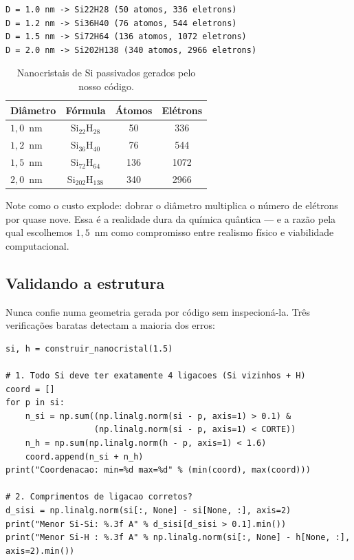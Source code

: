 \documentclass[11pt,a4paper,openany]{book}
\begin{document}
\begin{lstlisting}[style=console]
D = 1.0 nm -> Si22H28 (50 atomos, 336 eletrons)
D = 1.2 nm -> Si36H40 (76 atomos, 544 eletrons)
D = 1.5 nm -> Si72H64 (136 atomos, 1072 eletrons)
D = 2.0 nm -> Si202H138 (340 atomos, 2966 eletrons)
\end{lstlisting}

\begin{table}[h]
  \centering
  \caption{Nanocristais de Si passivados gerados pelo nosso código.}
  \label{tab:nanocristais}
  \begin{tabular}{lccc}
    \toprule
    \textbf{Diâmetro} & \textbf{Fórmula} & \textbf{Átomos} & \textbf{Elétrons} \\
    \midrule
    $1{,}0$~nm & Si$_{22}$H$_{28}$   & 50  & 336 \\
    $1{,}2$~nm & Si$_{36}$H$_{40}$   & 76  & 544 \\
    $1{,}5$~nm & Si$_{72}$H$_{64}$   & 136 & 1072 \\
    $2{,}0$~nm & Si$_{202}$H$_{138}$ & 340 & 2966 \\
    \bottomrule
  \end{tabular}
\end{table}

\noindent
Note como o custo explode: dobrar o diâmetro multiplica o número de elétrons por
quase nove. Essa é a realidade dura da química quântica --- e a razão pela qual
escolhemos $1{,}5$~nm como compromisso entre realismo físico e viabilidade
computacional.

\subsection{Validando a estrutura}

Nunca confie numa geometria gerada por código sem inspecioná-la. Três verificações
baratas detectam a maioria dos erros:

\begin{lstlisting}[style=python,caption={Validando o nanocristal.},label={lst:validar}]
si, h = construir_nanocristal(1.5)

# 1. Todo Si deve ter exatamente 4 ligacoes (Si vizinhos + H)
coord = []
for p in si:
    n_si = np.sum((np.linalg.norm(si - p, axis=1) > 0.1) &
                  (np.linalg.norm(si - p, axis=1) < CORTE))
    n_h = np.sum(np.linalg.norm(h - p, axis=1) < 1.6)
    coord.append(n_si + n_h)
print("Coordenacao: min=%d max=%d" % (min(coord), max(coord)))

# 2. Comprimentos de ligacao corretos?
d_sisi = np.linalg.norm(si[:, None] - si[None, :], axis=2)
print("Menor Si-Si: %.3f A" % d_sisi[d_sisi > 0.1].min())
print("Menor Si-H : %.3f A" % np.linalg.norm(si[:, None] - h[None, :], axis=2).min())
\end{lstlisting}
\end{document}
